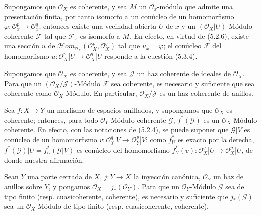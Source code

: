 \begin{env}[5.3.9]
\label{0.5.3.9-fr}
Supongamos que $\mathcal{O}_X$ es coherente, y sea $M$ un $\mathcal{O}_x$-módulo
que admite una presentación finita, por tanto isomorfo a un conúcleo de un
homomorfismo $\varphi:\mathcal{O}_x^p\to\mathcal{O}_x^q$; entonces existe una
vecindad abierta $U$ de $x$ y un $(\mathcal{O}_X|U)$-Módulo coherente
$\mathcal{F}$ tal que $\mathcal{F}_x$ es isomorfo a $M$. En efecto, en virtud
de (5.2.6), existe una sección $u$ de
$\mathcal{H}\!om_{\mathcal{O}_X}(\mathcal{O}_X^p,\mathcal{O}_X^q)$ tal que $u_x=\varphi$; el conúcleo
$\mathcal{F}$ del homomorfismo
$u:\mathcal{O}_X^p|U\to\mathcal{O}_X^q|U$ responde a la cuestión (5.3.4).
\end{env}

\begin{env}[5.3.10]
\label{0.5.3.10-fr}
Supongamos que $\mathcal{O}_X$ es coherente, y sea $\mathcal{J}$ un haz coherente
de ideales de $\mathcal{O}_X$. Para que un
$(\mathcal{O}_X/\mathcal{J})$-Módulo $\mathcal{F}$ sea coherente, es necesario y
suficiente que sea coherente como $\mathcal{O}_X$-Módulo. En particular,
$\mathcal{O}_X/\mathcal{J}$ es un haz coherente de anillos.
\end{env}

\begin{env}[5.3.11]
\label{0.5.3.11-fr}
Sea $f:X\to Y$ un morfismo de espacios anillados, y supongamos que
$\mathcal{O}_X$ es coherente; entonces, para todo $\mathcal{O}_Y$-Módulo coherente
$\mathcal{G}$, $f^*(\mathcal{G})$ es un $\mathcal{O}_X$-Módulo coherente. En
efecto, con las notaciones de (5.2.4), se puede suponer que $\mathcal{G}|V$ es
conúcleo de un homomorfismo
$v:\mathcal{O}_Y^q|V\to\mathcal{O}_Y^p|V$; como $f_U^*$ es exacto por la derecha,
$f^*(\mathcal{G})|U=f_U^*(\mathcal{G}|V)$ es conúcleo del homomorfismo
$f_U^*(v):\mathcal{O}_X^q|U\to\mathcal{O}_X^p|U$, de donde nuestra afirmación.
\end{env}

\begin{env}[5.3.12]
\label{0.5.3.12-fr}
Sean $Y$ una parte cerrada de $X$, $j:Y\to X$ la inyección canónica,
$\mathcal{O}_Y$ un haz de anillos sobre $Y$, y pongamos
$\mathcal{O}_X=j_*(\mathcal{O}_Y)$. Para que un $\mathcal{O}_Y$-Módulo
$\mathcal{G}$ sea de tipo finito (resp. cuasicoherente, coherente), es necesario y
suficiente que $j_*(\mathcal{G})$ sea un $\mathcal{O}_X$-Módulo de tipo finito
(resp. cuasicoherente, coherente).
\end{env}

